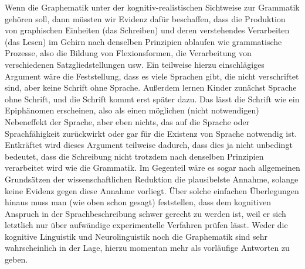 Wenn die Graphematik unter der kognitiv-realistischen Sichtweise zur Grammatik gehören soll, dann müssten wir Evidenz dafür beschaffen, dass die Produktion von graphischen Einheiten (das Schreiben) und deren verstehendes Verarbeiten (das Lesen) im Gehirn nach denselben Prinzipien ablaufen wie grammatische Prozesse, also die Bildung von Flexionsformen, die Verarbeitung von verschiedenen Satzgliedstellungen usw.
Ein teilweise hierzu einschlägiges Argument wäre die Feststellung, dass es viele Sprachen gibt, die nicht verschriftet sind, aber keine Schrift ohne Sprache.
Außerdem lernen Kinder zunächst Sprache ohne Schrift, und die Schrift kommt erst später dazu.
Das lässt die Schrift wie ein Epiphänomen erscheinen, also als einen möglichen (nicht notwendigen) Nebeneffekt der Sprache, aber eben nichts, das auf die Sprache oder Sprachfähigkeit zurückwirkt oder gar für die Existenz von Sprache notwendig ist.
Entkräftet wird dieses Argument teilweise dadurch, dass dies ja nicht unbedingt bedeutet, dass die Schreibung nicht trotzdem nach denselben Prinzipien verarbeitet wird wie die Grammatik.
Im Gegenteil wäre es sogar nach allgemeinen Grundsätzen der wissenschaftlichen Reduktion die plausibelste Annahme, solange keine Evidenz gegen diese Annahme vorliegt.
Über solche einfachen Überlegungen hinaus muss man (wie oben schon gesagt) feststellen, dass dem kognitiven Anspruch in der Sprachbeschreibung schwer gerecht zu werden ist, weil er sich letztlich nur über aufwändige experimentelle Verfahren prüfen lässt.
Weder die kognitive Linguistik und Neurolinguistik noch die Graphematik sind sehr wahrscheinlich in der Lage, hierzu momentan mehr als vorläufige Antworten zu geben.

